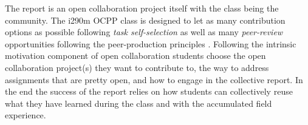 The report is an open collaboration project itself with the class being the community. The i290m OCPP class is designed to let as many contribution options as possible following {\it task self-selection} as well as many {\it peer-review} opportunities following the peer-production principles \cite{benkler2002}. Following the intrinsic motivation component of open collaboration students choose the open collaboration project(s) they want to contribute to, the way to address assignments that are pretty open, and how to engage in the collective report. In the end the success of the report relies on how students can collectively reuse what they have learned during the class and with the accumulated field experience. 


